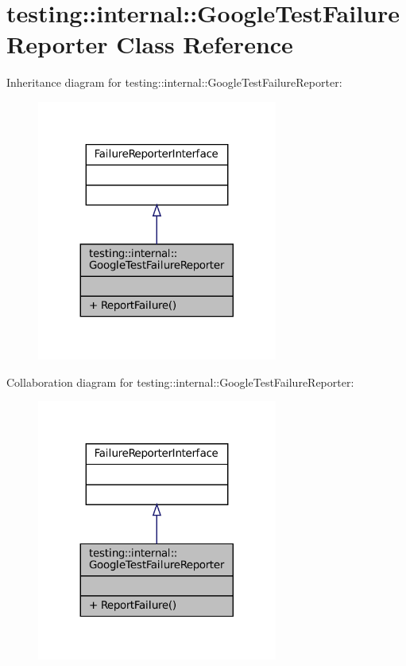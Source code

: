 \hypertarget{classtesting_1_1internal_1_1GoogleTestFailureReporter}{}\section{testing\+:\+:internal\+:\+:Google\+Test\+Failure\+Reporter Class Reference}
\label{classtesting_1_1internal_1_1GoogleTestFailureReporter}


Inheritance diagram for testing\+:\+:internal\+:\+:Google\+Test\+Failure\+Reporter\+:
\nopagebreak
\begin{figure}[H]
\begin{center}
\leavevmode
\includegraphics[width=224pt]{classtesting_1_1internal_1_1GoogleTestFailureReporter__inherit__graph}
\end{center}
\end{figure}


Collaboration diagram for testing\+:\+:internal\+:\+:Google\+Test\+Failure\+Reporter\+:
\nopagebreak
\begin{figure}[H]
\begin{center}
\leavevmode
\includegraphics[width=224pt]{classtesting_1_1internal_1_1GoogleTestFailureReporter__coll__graph}
\end{center}
\end{figure}
